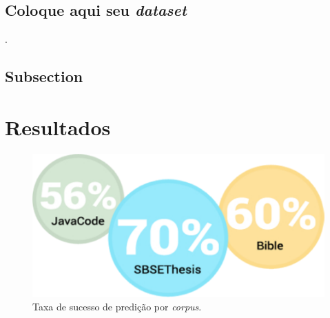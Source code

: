 \documentclass[isoft]{ufgposter}
\begin{document}
\begin{poster}
\subsection{Coloque aqui seu \textit{dataset}}

\lipsum[54]

\vspace{1cm}
\begin{table}
\centering
\captionsetup{type=table}
\caption{\textit{Corpus} utilizados no estudo}
\label{Corpus}
\renewcommand{\arraystretch}{1.2}
\end{table}
\vspace{1cm}

\lipsum[57]

\citep{defects2j}.

\subsection{Subsection}
\lipsum[8]

\section{Resultados}%

\begin{figure}
\centering
\captionsetup{type=figure}
\includegraphics[scale=2]{resultado}
\caption{Taxa de sucesso de predição por \textit{corpus}.}
\label{fig:result}
\end{figure}


\end{poster}
\end{document}
